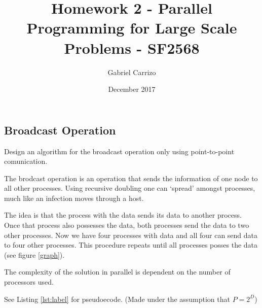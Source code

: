 \documentclass[a4paper]{exam}
\title{Homework 2 - Parallel Programming for Large Scale Problems - SF2568}
\author{Gabriel Carrizo}
\date{December 2017}
\begin{document}
\maketitle

\pagebreak
\begin{questions}

\section{Broadcast Operation}

\addpoints\question Design an algorithm for the broadcast operation only using point-to-point comunication.

\begin{solution}
The brodcast operation is an operation that sends the information of one node to all other processes. Using recursive doubling one can `spread' amongst processes, much like an infection moves through a host.

The idea is that the process with the data sends its data to another process. Once that process also possesses the data, both processes send the data to two other processes. Now we have four processes with data and all four can send data to four other processes. This procedure repeats until all processes posses the data (see figure \ref{graph}).

The complexity of the solution in parallel is dependent on the number of processors used.

See Listing \ref{lst:label} for pseudoecode. (Made under the assumption that $P=2^D$)
\end{solution}

\begin{figure}[ht!]
  \center
{}
\end{figure}
\end{questions}
\end{document}

